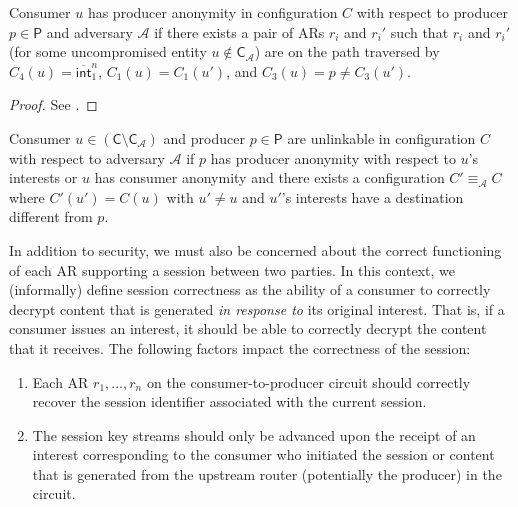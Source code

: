 \begin{thm}
Consumer $u$ has producer anonymity in configuration $C$ with respect to producer $p \in \mathsf{P}$ and adversary $\mathcal{A}$ if there exists a pair of ARs $r_i$ and $r_i'$ such that $r_i$ and $r_i'$ (for some uncompromised entity $u \notin \mathsf{C}_{\mathcal{A}}$) are on the path traversed by $C_4(u) = \overline{\mathsf{int}}_1^n$, $C_1(u) = C_1(u')$, and $C_3(u) = p \not= C_3(u')$.
\end{thm}
\begin{proof}
See \cite{andana}.
\end{proof}

\begin{cor}
Consumer $u \in (\mathsf{C} \setminus \mathsf{C}_{\mathcal{A}})$ and producer $p \in \mathsf{P}$ are unlinkable in configuration $C$ with respect to adversary $\mathcal{A}$ if $p$ has producer anonymity with respect to $u$'s interests or $u$ has consumer anonymity and there exists a configuration $C' \equiv_{\mathcal{A}} C$ where $C'(u') = C(u)$ with $u' \not= u$ and $u'$'s interests have a destination different from $p$. 
\end{cor}

In addition to security, we must also be concerned about the correct functioning of each AR supporting a session between two parties. In this context, we (informally) define session correctness as the ability of a consumer to correctly decrypt content that is generated \emph{in response to} its original interest. That is, if a consumer issues an interest, it should be able to correctly decrypt the content that it receives. The following factors impact the correctness of the session:
\begin{enumerate}
  \item Each AR $r_1,\dots,r_n$ on the consumer-to-producer circuit should correctly recover the session identifier associated with the current session. 
  \item The session key streams should only be advanced upon the receipt of an interest corresponding to the consumer who initiated the session or content that is generated from the upstream router (potentially the producer) in the circuit.
\end{enumerate}

